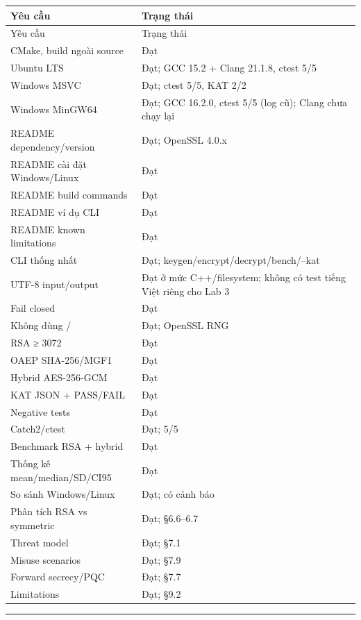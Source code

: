 \documentclass[12pt,a4paper,oneside]{report}
\let\origtexttt\texttt
\renewcommand{\texttt}[1]{\origtexttt{\seqsplit{#1}}}
\begin{document}
\begin{longtable}{p{}p{}}
\toprule
Yêu cầu & Trạng thái \\
\midrule
\endfirsthead
\toprule
Yêu cầu & Trạng thái \\
\midrule
\endhead
CMake, build ngoài source & Đạt \\
Ubuntu LTS & Đạt; GCC 15.2 + Clang 21.1.8, ctest 5/5 \\
Windows MSVC & Đạt; ctest 5/5, KAT 2/2 \\
Windows MinGW64 & Đạt; GCC 16.2.0, ctest 5/5 (log cũ); Clang chưa chạy lại \\
README dependency/version & Đạt; OpenSSL 4.0.x \\
README cài đặt Windows/Linux & Đạt \\
README build commands & Đạt \\
README ví dụ CLI & Đạt \\
README known limitations & Đạt \\
CLI thống nhất & Đạt; keygen/encrypt/decrypt/bench/--kat \\
UTF-8 input/output & Đạt ở mức C++/filesystem; không có test tiếng Việt riêng cho Lab 3 \\
Fail closed & Đạt \\
Không dùng \texttt{rand()}/\texttt{std::random} & Đạt; OpenSSL RNG \\
RSA ≥ 3072 & Đạt \\
OAEP SHA-256/MGF1 & Đạt \\
Hybrid AES-256-GCM & Đạt \\
KAT JSON + PASS/FAIL & Đạt \\
Negative tests & Đạt \\
Catch2/ctest & Đạt; 5/5 \\
Benchmark RSA + hybrid & Đạt \\
Thống kê mean/median/SD/CI95 & Đạt \\
So sánh Windows/Linux & Đạt; có cảnh báo \\
Phân tích RSA vs symmetric & Đạt; §6.6–6.7 \\
Threat model & Đạt; §7.1 \\
Misuse scenarios & Đạt; §7.9 \\
Forward secrecy/PQC & Đạt; §7.7 \\
Limitations & Đạt; §9.2 \\
\bottomrule
\end{longtable}


\par\noindent\rule{\textwidth}{0.4pt}
\end{document}
